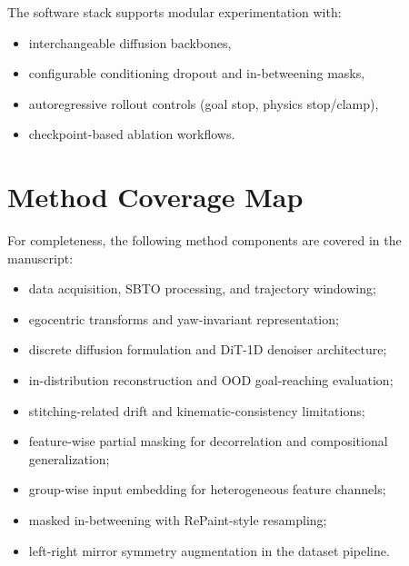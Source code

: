 The software stack supports modular experimentation with:
\begin{itemize}
	\item interchangeable diffusion backbones,
	\item configurable conditioning dropout and in-betweening masks,
	\item autoregressive rollout controls (goal stop, physics stop/clamp),
	\item checkpoint-based ablation workflows.
\end{itemize}

\section{Method Coverage Map}

For completeness, the following method components are covered in the manuscript:
\begin{itemize}
\item data acquisition, SBTO processing, and trajectory windowing;
\item egocentric transforms and yaw-invariant representation;
\item discrete diffusion formulation and DiT-1D denoiser architecture;
\item in-distribution reconstruction and OOD goal-reaching evaluation;
\item stitching-related drift and kinematic-consistency limitations;
\item feature-wise partial masking for decorrelation and compositional generalization;
\item group-wise input embedding for heterogeneous feature channels;
\item masked in-betweening with RePaint-style resampling;
\item left-right mirror symmetry augmentation in the dataset pipeline.
\end{itemize}
